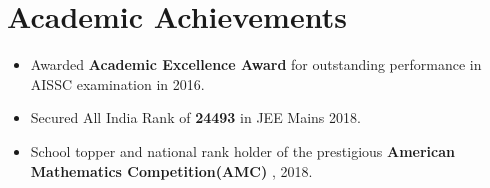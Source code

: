 \section*{Academic Achievements}
\begin{itemize}[itemsep=0mm]

\item Awarded \textbf{Academic Excellence Award} for outstanding performance in AISSC examination in 2016.
\item Secured All India Rank of \textbf{24493} in JEE Mains 2018.
\item School topper and national rank holder of the prestigious \textbf{American Mathematics Competition(AMC)} , 2018.

\end{itemize}
